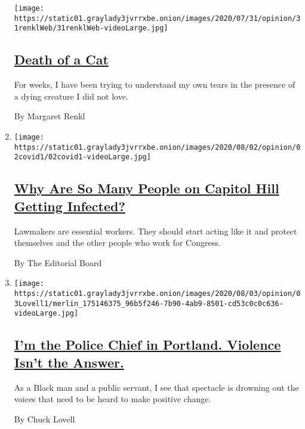 \begin{enumerate}
  \texttt{[image: https://static01.graylady3jvrrxbe.onion/images/2020/07/31/opinion/31renklWeb/31renklWeb-videoLarge.jpg]}

  \hypertarget{death-of-a-cat}{%
  \subsection{\texorpdfstring{\href{/2020/08/03/opinion/feral-cat-dying.html}{Death
  of a Cat}}{Death of a Cat}}\label{death-of-a-cat}}

  For weeks, I have been trying to understand my own tears in the
  presence of a dying creature I did not love.

  By Margaret Renkl
\item
  \texttt{[image: https://static01.graylady3jvrrxbe.onion/images/2020/08/02/opinion/02covid1/02covid1-videoLarge.jpg]}

  \hypertarget{why-are-so-many-people-on-capitol-hill-getting-infected}{%
  \subsection{\texorpdfstring{\href{/2020/08/02/opinion/coronavirus-gohmert-congress-testing.html}{Why
  Are So Many People on Capitol Hill Getting
  Infected?}}{Why Are So Many People on Capitol Hill Getting Infected?}}\label{why-are-so-many-people-on-capitol-hill-getting-infected}}

  Lawmakers are essential workers. They should start acting like it and
  protect themselves and the other people who work for Congress.

  By The Editorial Board
\item
  \texttt{[image: https://static01.graylady3jvrrxbe.onion/images/2020/08/03/opinion/03Lovell1/merlin\_175146375\_96b5f246-7b90-4ab9-8501-cd53c0c0c636-videoLarge.jpg]}

  \hypertarget{im-the-police-chief-in-portland-violence-isnt-the-answer}{%
  \subsection{\texorpdfstring{\href{/2020/08/03/opinion/portland-protests-police-chief.html}{I'm
  the Police Chief in Portland. Violence Isn't the
  Answer.}}{I'm the Police Chief in Portland. Violence Isn't the Answer.}}\label{im-the-police-chief-in-portland-violence-isnt-the-answer}}

  As a Black man and a public servant, I see that spectacle is drowning
  out the voices that need to be heard to make positive change.

  By Chuck Lovell
\end{enumerate}

